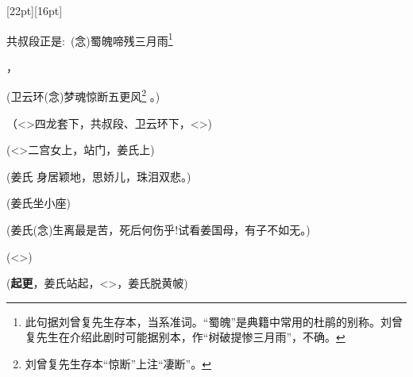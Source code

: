{{%
\raisebox{0pt}[22pt][16pt]{\raisebox{-8pt}{\hspace{-32pt}{卫云环}}}

共叔段\hspace{20pt}正是:~({\akai 念})蜀魄啼残三月雨\footnote{此句据刘曾复先生存本，当系准词。``蜀魄''是典籍中常用的杜鹃的别称。刘曾复先生在介绍此剧时可能据别本，作``树破提惨三月雨''，不确。}%
}，

(卫云环\hspace{15pt}({\akai 念})梦魂惊断五更风\footnote{刘曾复先生存本``惊断''上注``凄断''。}%
。)

（\textless{}\!\textgreater{}{\hwfs 四}龙套{\hwfs 下}，共叔段、卫云环{\hwfs 下}，\textless{}\!\textgreater{})

\vspace{5pt}

(\textless{}\!\textgreater{}{\hwfs 二}宫女{\hwfs 上}，{\hwfs 站门}，姜氏{\hwfs 上})

(姜氏\hspace{25pt}{[}{\akai 引子}{]} 身居颖地，思娇儿，珠泪双悲。)

(姜氏坐{\hwfs 小座})

(姜氏\hspace{25pt}({\akai 念})生离最是苦，死后何伤乎!试看姜国母，有子不如无。)


(\textless{}\!\textgreater{})


({\bfseries\akai 起更}，姜氏{\hwfs 站起}，\textless{}\!\textgreater{}，姜氏{\hwfs 脱黄帔})

}
